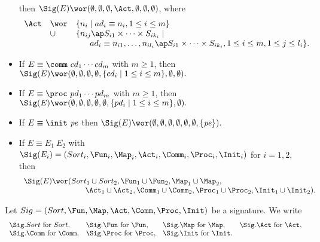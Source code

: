 \documentclass[twoside,fleqn,a4paper,dvips]{article}
\begin{document}
\begin{defn}
\begin{itemize}
then
$\Sig(E)\wor(\emptyset,\emptyset,\emptyset,\Act,
\emptyset,\emptyset,
\emptyset)$, where
\[\begin{array}{lll}
\Act&\wor&
\{n_{i}\mid ad_i\equiv
n_{i}, 1\leq i\leq m \}\\
&\cup&\{n_{ij}\ap S_{i1}\times\cdots\times S_{ik_i}\mid\\
&&~~~~~ad_i\equiv
n_{i1},\ldots,n_{il_i}\ap S_{i1}\times\cdots\times S_{ik_i}, 1\leq i\leq
m, 1\leq j\leq l_i\}.
\end{array}
\]
\item
If $E\equiv
\comm~cd_1\cdots cd_m$ with $m\geq 1$,
then
$\Sig(E)\wor(\emptyset,\emptyset,\emptyset,\emptyset,
\{cd_i\mid 1\leq
i\leq m\}, \emptyset,\emptyset).$
\item
If $E\equiv
\proc~pd_1\cdots pd_m$ with $m\geq 1$,
then
$\Sig(E)\wor(\emptyset,\emptyset,\emptyset,\emptyset,\emptyset,
\{pd_i\mid 1\leq i\leq m\},\emptyset).$
\item
If $E\equiv
\init~\pe$ then $\Sig(E)\wor(\emptyset,\emptyset,\emptyset,\emptyset,\emptyset,
\emptyset,\{\pe\}).$
\item
If $E\equiv E_1~E_2$
with $\Sig(E_i)=(Sort_{i},\Fun_{i},\Map_i,
\Act_{i},\Comm_{i},\Proc_{i},\Init_i)$ for $i=1,2$, then
\[\begin{array}{l}
\Sig(E)\wor(Sort_{1}\cup Sort_{2},\Fun_{1}\cup \Fun_{2},
\Map_1\cup\Map_2,\\
\hspace{8em}\Act_{1}\cup \Act_{2},\Comm_{1}\cup \Comm_{2},\Proc_{1}\cup
\Proc_{2},
\Init_1\cup\Init_2).
\end{array}\]
\end{itemize}
\end{defn}
\begin{defn}
Let $Sig=(Sort,\Fun,\Map,\Act,\Comm,\Proc,\Init)$ be a signature. We write
\[\begin{array}{llll}
\Sig.Sort~\mbox{for}~Sort,&
\Sig.\Fun~\mbox{for}~\Fun,&
\Sig.\Map~{\rm for}~\Map,&
\Sig.\Act~\mbox{for}~\Act,\\
\Sig.\Comm~\mbox{for}~\Comm,&
\Sig.\Proc~\mbox{for}~\Proc,&
\Sig.\Init~\mbox{for}~\Init.
\end{array}\]
\end{defn}
\end{document}
